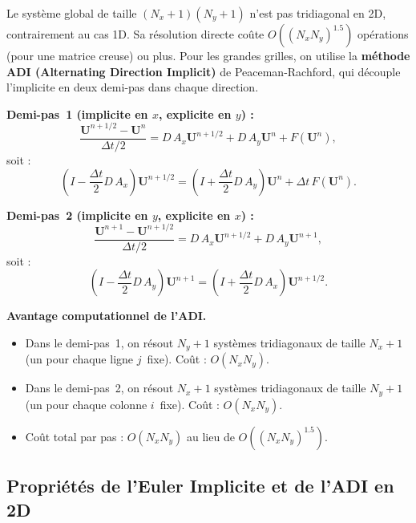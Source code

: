 \documentclass[11pt,a4paper]{report}
\begin{document}
Le syst\`eme global de taille $(N_x+1)(N_y+1)$ n'est pas tridiagonal en 2D,
contrairement au cas 1D. Sa r\'esolution directe co\^ute $O((N_xN_y)^{1.5})$ op\'erations
(pour une matrice creuse) ou plus. Pour les grandes grilles, on utilise la
\textbf{m\'ethode ADI (Alternating Direction Implicit)} de Peaceman-Rachford,
qui d\'ecouple l'implicite en deux demi-pas dans chaque direction.

\textbf{Demi-pas~1 (implicite en $x$, explicite en $y$) :}
\begin{equation}
  \frac{\mathbf{U}^{n+1/2} - \mathbf{U}^n}{\Delta t/2}
  = D\,A_x\mathbf{U}^{n+1/2} + D\,A_y\mathbf{U}^n + F(\mathbf{U}^n),
\end{equation}
soit :
\begin{equation}\label{eq:adi_step1}
  \left(I - \frac{\Delta t}{2}D\,A_x\right)\mathbf{U}^{n+1/2}
  = \left(I + \frac{\Delta t}{2}D\,A_y\right)\mathbf{U}^n + \Delta t\,F(\mathbf{U}^n).
\end{equation}

\textbf{Demi-pas~2 (implicite en $y$, explicite en $x$) :}
\begin{equation}
  \frac{\mathbf{U}^{n+1} - \mathbf{U}^{n+1/2}}{\Delta t/2}
  = D\,A_x\mathbf{U}^{n+1/2} + D\,A_y\mathbf{U}^{n+1},
\end{equation}
soit :
\begin{equation}\label{eq:adi_step2}
  \left(I - \frac{\Delta t}{2}D\,A_y\right)\mathbf{U}^{n+1}
  = \left(I + \frac{\Delta t}{2}D\,A_x\right)\mathbf{U}^{n+1/2}.
\end{equation}

\textbf{Avantage computationnel de l'ADI.}
\begin{itemize}[leftmargin=1.5em]
  \item Dans le demi-pas~1, on r\'esout $N_y+1$ syst\`emes tridiagonaux de taille $N_x+1$
        (un pour chaque ligne $j$~fixe). Co\^ut : $O(N_xN_y)$.
  \item Dans le demi-pas~2, on r\'esout $N_x+1$ syst\`emes tridiagonaux de taille $N_y+1$
        (un pour chaque colonne $i$~fixe). Co\^ut : $O(N_xN_y)$.
  \item Co\^ut total par pas : $O(N_xN_y)$ au lieu de $O((N_xN_y)^{1.5})$.
\end{itemize}

\subsection*{Propri\'et\'es de l'Euler Implicite et de l'ADI en 2D}
\end{document}
